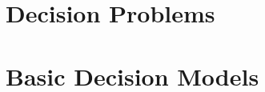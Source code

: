 \documentclass[11pt]{report}
\theoremstyle{definition}
\begin{document}
	\maketitle
	\tableofcontents
	\newpage	
	
	\part{Decision Problems}
	
	
	
	
	
	\part{Basic Decision Models}
	
	
	
	
	
	
	
\end{document}
